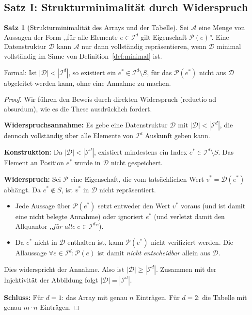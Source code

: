 ﻿\documentclass[a4paper,12pt]{article}
\theoremstyle{definition}
\newtheorem{satz}{Satz}
\begin{document}
\subsection{Satz I: Strukturminimalit\"{a}t durch Widerspruch}

\begin{satz}[Strukturminimalit\"{a}t des Arrays und der Tabelle]
    \label{satz:strukturmin}
    Sei $\mathcal{A}$ eine Menge von Aussagen der Form
    ,,f\"{u}r alle Elemente $e \in \mathcal{I}^d$ gilt Eigenschaft $\mathcal{P}(e)$''.
    Eine Datenstruktur $\mathcal{D}$ kann $\mathcal{A}$ nur dann vollst\"{a}ndig
    repr\"{a}sentieren, wenn $\mathcal{D}$ minimal vollst\"{a}ndig im Sinne von
    Definition~\ref{def:minimal} ist.

    Formal: Ist $|\mathcal{D}| < |\mathcal{I}^d|$, so existiert ein
    $e^* \in \mathcal{I}^d \setminus S$, f\"{u}r das $\mathcal{P}(e^*)$ nicht
    aus $\mathcal{D}$ abgeleitet werden kann, ohne eine Annahme zu machen.
\end{satz}

\begin{proof}
    Wir f\"{u}hren den Beweis durch direkten Widerspruch (reductio ad absurdum),
    wie es die These ausdr\"{u}cklich fordert.

    \textbf{Widerspruchsannahme:} Es gebe eine Datenstruktur
    $\mathcal{D}$ mit $|\mathcal{D}| < |\mathcal{I}^d|$, die dennoch vollst\"{a}ndig
    \"{u}ber alle Elemente von $\mathcal{I}^d$ Auskunft geben kann.

    \textbf{Konstruktion:} Da $|\mathcal{D}| < |\mathcal{I}^d|$, existiert
    mindestens ein Index $e^* \in \mathcal{I}^d \setminus S$.
    Das Element an Position $e^*$ wurde in $\mathcal{D}$ nicht gespeichert.

    \textbf{Widerspruch:} Sei $\mathcal{P}$ eine Eigenschaft, die vom
    tats\"{a}chlichen Wert $v^* = \mathcal{D}(e^*)$ abh\"{a}ngt.
    Da $e^* \notin S$, ist $v^*$ in $\mathcal{D}$ nicht repr\"{a}sentiert.
    \begin{itemize}
        \item Jede Aussage \"{u}ber $\mathcal{P}(e^*)$ setzt entweder den Wert
              $v^*$ voraus (und ist damit eine nicht belegte Annahme) oder
              ignoriert $e^*$ (und verletzt damit den Allquantor
              ,,\emph{f\"{u}r alle} $e \in \mathcal{I}^d$'').
        \item Da $e^*$ nicht in $\mathcal{D}$ enthalten ist, kann $\mathcal{P}(e^*)$
              nicht verifiziert werden. Die Allaussage
              $\forall e \in \mathcal{I}^d: \mathcal{P}(e)$ ist damit
              \emph{nicht entscheidbar} allein aus $\mathcal{D}$.
    \end{itemize}
    Dies widerspricht der Annahme. Also ist $|\mathcal{D}| \geq |\mathcal{I}^d|$.
    Zusammen mit der Injektivit\"{a}t der Abbildung folgt
    $|\mathcal{D}| = |\mathcal{I}^d|$.

    \textbf{Schluss:}
    F\"{u}r $d = 1$: das Array mit genau $n$ Eintr\"{a}gen.
    F\"{u}r $d = 2$: die Tabelle mit genau $m \cdot n$ Eintr\"{a}gen. \qedhere
\end{proof}
\end{document}
